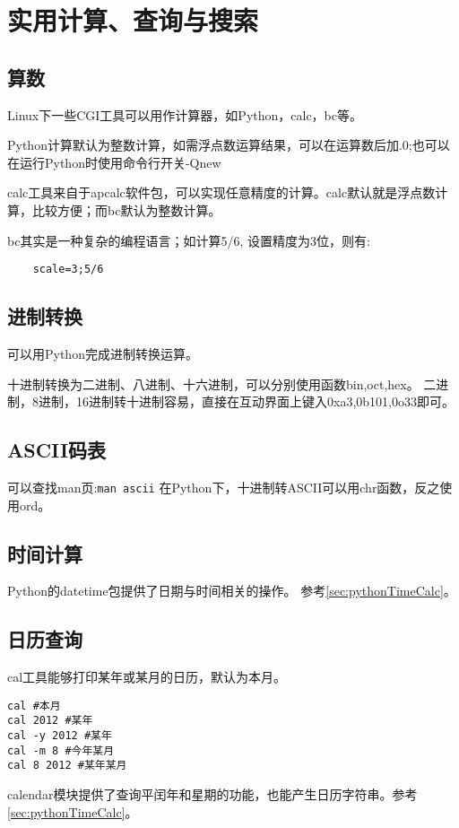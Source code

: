 \section{实用计算、查询与搜索}

\subsection{算数}
Linux下一些CGI工具可以用作计算器，如Python，calc，bc等。

Python计算默认为整数计算，如需浮点数运算结果，可以在运算数后加.0;也可以在运行Python时使用命令行开关-Qnew

calc工具来自于apcalc软件包，可以实现任意精度的计算。calc默认就是浮点数计算，比较方便；而bc默认为整数计算。

bc其实是一种复杂的编程语言；如计算5/6, 设置精度为3位，则有:
\begin{verbatim}
	scale=3;5/6
\end{verbatim}

\subsection{进制转换}
可以用Python完成进制转换运算。

十进制转换为二进制、八进制、十六进制，可以分别使用函数bin,oct,hex。 
二进制，8进制，16进制转十进制容易，直接在互动界面上键入0xa3,0b101,0o33即可。

\subsection{ASCII码表}
可以查找man页:\verb+man ascii+
在Python下，十进制转ASCII可以用chr函数，反之使用ord。

\subsection{时间计算} 
Python的datetime包提供了日期与时间相关的操作。 参考\ref{sec:pythonTimeCalc}。

\subsection{日历查询}
cal工具能够打印某年或某月的日历，默认为本月。
\begin{verbatim}
cal #本月
cal 2012 #某年
cal -y 2012 #某年
cal -m 8 #今年某月
cal 8 2012 #某年某月
\end{verbatim}

calendar模块提供了查询平闰年和星期的功能，也能产生日历字符串。参考\ref{sec:pythonTimeCalc}。

